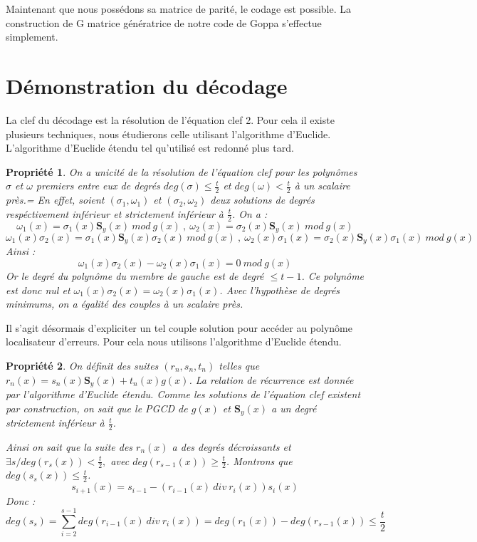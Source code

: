 \documentclass{article}
\newtheorem{prop}{Propriété}
\begin{document}
		Maintenant que nous possédons sa matrice de parité, le codage est possible. 
		La construction de G matrice génératrice de notre code de Goppa s'effectue simplement.

	\section{Démonstration du décodage}
		\label{eqclef}
		La clef du décodage est la résolution de l'équation clef 2.
		Pour cela il existe plusieurs techniques, nous étudierons celle utilisant l'algorithme d'Euclide.
		L'algorithme d'Euclide étendu tel qu'utilisé est redonné plus tard.

		\begin{prop} \label{unicite} \cite{goppa}
			On a unicité de la résolution de l'équation clef pour les polynômes $\sigma$ et $\omega$ premiers entre eux de degrés  $deg(\sigma) \leq \frac{t}{2}$ et $ deg(\omega) < \frac{t}{2} $ à un scalaire près.=
			En effet, soient $(\sigma_{1},\omega_{1})$ et $(\sigma_{2},\omega_{2})$ deux solutions de degrés respéctivement inférieur et strictement inférieur à $\frac{t}{2}$.
			On a :
			$$ \omega_{1}(x) = \sigma_{1}(x)\mathbf{S}_{y}(x) \ mod \ g(x) \ , \ \omega_{2}(x) = \sigma_{2}(x)\mathbf{S}_{y}(x) \ mod \ g(x) $$
			$$ \omega_{1}(x)\sigma_{2}(x) = \sigma_{1}(x)\mathbf{S}_{y}(x)\sigma_{2}(x) \ mod \ g(x) \ , \ \omega_{2}(x)\sigma_{1}(x) = \sigma_{2}(x)\mathbf{S}_{y}(x)\sigma_{1}(x) \ mod \ g(x) $$
			Ainsi :
			$$ \omega_{1}(x)\sigma_{2}(x) - \omega_{2}(x)\sigma_{1}(x) = 0 \ mod \ g(x) $$
			Or le degré du polynôme du membre de gauche est de degré $\leq t-1$.
			Ce polynôme est donc nul et $ \omega_{1}(x)\sigma_{2}(x) = \omega_{2}(x)\sigma_{1}(x) $.
			Avec l'hypothèse de degrés minimums, on a égalité des couples à un scalaire près.
		\end{prop}

		Il s'agit désormais d'expliciter un tel couple solution pour accéder au polynôme localisateur d'erreurs.
		Pour cela nous utilisons l'algorithme d'Euclide étendu.

		\begin{prop} \label{existence}
			On définit des suites $(r_{n},s_{n},t_{n})$ telles que $ r_{n}(x) = s_{n}(x)\mathbf{S}_{y}(x) + t_{n}(x)g(x) $.
			La relation de récurrence est donnée par l'algorithme d'Euclide étendu.
			Comme les solutions de l'équation clef existent par construction, on sait que le PGCD de $g(x)$ et $\mathbf{S}_{y}(x)$ a un degré strictement inférieur à $\frac{t}{2}$.

			Ainsi on sait que la suite des $r_{n}(x)$ a des degrés décroissants et $\exists s / deg(r_{s}(x)) < \frac{t}{2},$ avec $deg(r_{s-1}(x)) \geq \frac{t}{2}$.
			Montrons que $deg(s_{s}(x)) \leq \frac{t}{2}$.
			$$ s_{i+1}(x) = s_{i-1} - (r_{i-1}(x) \ div  \ r_{i}(x))s_{i}(x) $$
			Donc :
			$$ deg(s_{s}) = \sum_{i=2}^{s-1} deg(r_{i-1}(x) \ div  \ r_{i}(x)) = deg(r_{1}(x)) - deg(r_{s-1}(x)) \leq \frac{t}{2}$$
		\end{prop}
\end{document}
